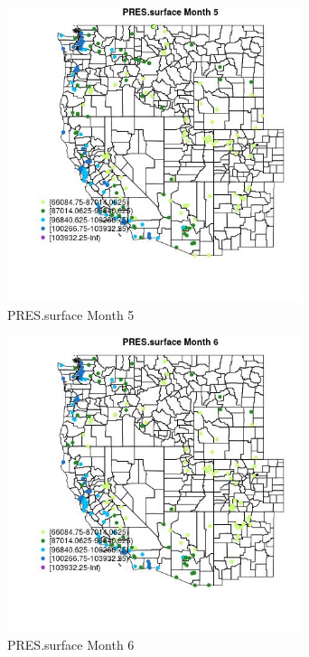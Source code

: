 \begin{figure} 
\centering  
\includegraphics[width=0.77\textwidth]{Code_Outputs/Report_ML_input_PM25_Step4_part_e_de_duplicated_aveswNAs_MapObsMo5PRESsurface.jpg} 
\caption{\label{fig:Report_ML_input_PM25_Step4_part_e_de_duplicated_aveswNAsMapObsMo5PRESsurface}PRES.surface Month 5} 
\end{figure} 
 

\begin{figure} 
\centering  
\includegraphics[width=0.77\textwidth]{Code_Outputs/Report_ML_input_PM25_Step4_part_e_de_duplicated_aveswNAs_MapObsMo6PRESsurface.jpg} 
\caption{\label{fig:Report_ML_input_PM25_Step4_part_e_de_duplicated_aveswNAsMapObsMo6PRESsurface}PRES.surface Month 6} 
\end{figure} 
 

